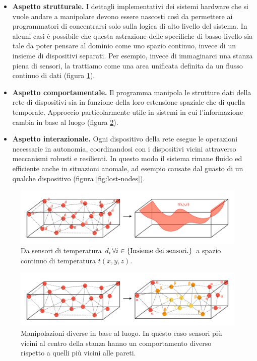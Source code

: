 \documentclass[12pt,a4paper,openright,twoside]{book}
\begin{document}
\begin{itemize}
    \item \textbf{Aspetto strutturale.} I dettagli implementativi dei sistemi hardware che si vuole andare a manipolare devono essere nascosti così da permettere ai programmatori di concentrarsi solo sulla logica di alto livello del sistema. In alcuni casi è possibile che questa astrazione delle specifiche di basso livello sia tale da poter pensare al dominio come uno spazio continuo, invece di un insieme di dispositivi separati. Per esempio, invece di immaginarci una stanza piena di sensori, la trattiamo come una area unificata definita da un flusso continuo di dati (figura \ref{fig:points-to-linear}).
    \item \textbf{Aspetto comportamentale.} Il programma manipola le strutture dati della rete di dispositivi sia in funzione della loro estensione spaziale che di quella temporale. Approccio particolarmente utile in sistemi in cui l'informazione cambia in base al luogo (figura \ref{fig:different-function}).
    \item \textbf{Aspetto interazionale.} Ogni dispositivo della rete esegue le operazioni necessarie in autonomia, coordinandosi con i dispositivi vicini attraverso meccanismi robusti e resilienti. In questo modo il sistema rimane fluido ed efficiente anche in situazioni anomale, ad esempio causate dal guasto di un qualche dispositivo (figura \ref{fig:lost-nodes}).
\end{itemize}

\begin{figure}
    \centering
    \includegraphics[width=.9\linewidth]{figures/points-to-gradient.pdf}
    \caption{Da sensori di temperatura $d_i \thinspace \forall i \in {\text{\{Insieme dei sensori.\}}}$ a spazio continuo di temperatura $t(x,y,z)$.}
    \label{fig:points-to-linear}
\end{figure}

\begin{figure}
    \centering
    \includegraphics[width=.9\linewidth]{figures/different-function.pdf}
    \caption{Manipolazioni diverse in base al luogo. In questo caso sensori più vicini al centro della stanza hanno un comportamento diverso rispetto a quelli più vicini alle pareti.}
    \label{fig:different-function}
\end{figure}
\end{document}
